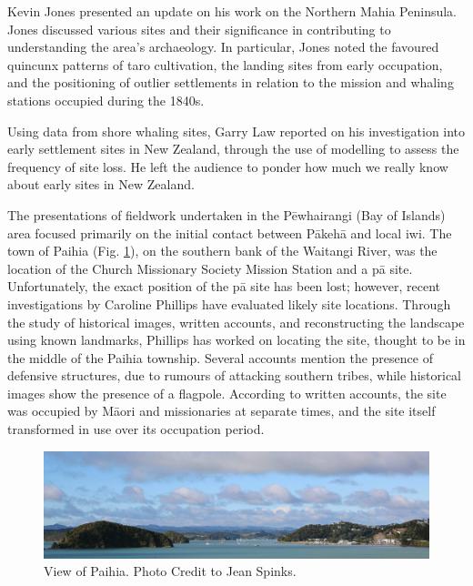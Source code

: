 Kevin Jones presented an update on his work on the Northern Mahia Peninsula. Jones discussed various sites and their significance in contributing to understanding the area’s archaeology. In particular, Jones noted the favoured quincunx patterns of taro cultivation, the landing sites from early occupation, and the positioning of outlier settlements in relation to the mission and whaling stations occupied during the 1840s. 

Using data from shore whaling sites, Garry Law reported on his investigation into early settlement sites in New Zealand, through the use of modelling to assess the frequency of site loss. He left the audience to ponder how much we really know about early sites in New Zealand.


The presentations of fieldwork undertaken in the Pēwhairangi (Bay of Islands) area focused primarily on the initial contact between Pākehā and local iwi. The town of Paihia (Fig. \ref{fig:NZAA_Fig6}), on the southern bank of the Waitangi River, was the location of the  Church Missionary Society Mission Station and a pā site. Unfortunately, the exact position of the pā site has been lost; however, recent investigations by Caroline Phillips have evaluated likely site locations. Through the study of historical images, written accounts, and reconstructing the landscape using known landmarks, Phillips has worked on locating the site, thought to be in the middle of the Paihia township. Several accounts mention the presence of defensive structures, due to rumours of attacking southern tribes, while historical images show the presence of a flagpole. According to written accounts, the site was occupied by Māori and missionaries at separate times, and the site itself transformed in use over its occupation period.

	\begin{figure}
		\includegraphics[width=\linewidth]{figures/NZAA_Fig6.jpg}
		\centering
		\caption{View of Paihia. Photo Credit to Jean Spinks.}
		\label{fig:NZAA_Fig6}
	\end{figure}
	

